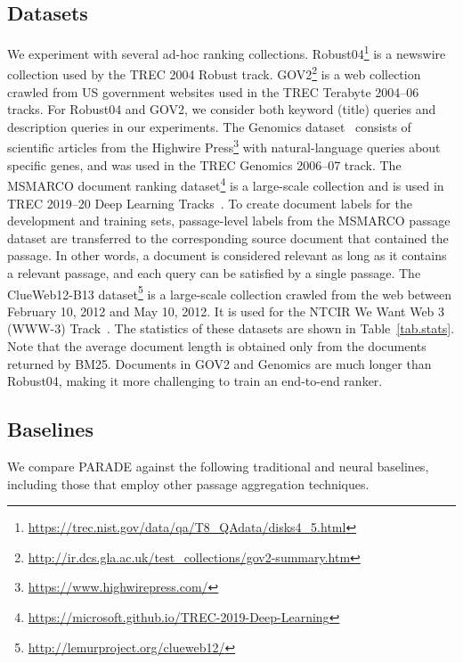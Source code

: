 










\subsection{Datasets} \label{sec:PARADE_dataset}

We experiment with several ad-hoc ranking collections.
Robust04\footnote{\url{https://trec.nist.gov/data/qa/T8_QAdata/disks4_5.html}} is a newswire collection used by the TREC 2004 Robust track.
GOV2\footnote{\url{http://ir.dcs.gla.ac.uk/test_collections/gov2-summary.htm}} is a web collection crawled from US government websites used in the TREC Terabyte 2004--06 tracks.
For Robust04 and GOV2, we consider both keyword (title) queries and description queries in our experiments.
The Genomics dataset~\cite{Hersh2006TrecGenomics,Hersh2007TrecGenomics} consists of scientific articles from the Highwire Press\footnote{\url{https://www.highwirepress.com/}} with natural-language queries about specific genes, and was used in the TREC Genomics 2006--07 track.
The MSMARCO document ranking dataset\footnote{\url{https://microsoft.github.io/TREC-2019-Deep-Learning}} is a large-scale collection and is used in TREC 2019--20 Deep Learning Tracks~\cite{DBLP:conf/trec/CraswellMYCV19,DBLP:conf/trec/CraswellMYC20}.
To create document labels for the development and training sets, passage-level labels from the MSMARCO passage dataset are transferred to the corresponding source document that contained the passage.
In other words, a document is considered relevant as long as it contains a relevant passage, and each query can be satisfied by a single passage.
The ClueWeb12-B13 dataset\footnote{\url{http://lemurproject.org/clueweb12/}} is a large-scale collection crawled from the web between February 10, 2012 and May 10, 2012. 
It is used for the NTCIR We Want Web 3 (WWW-3) Track~\cite{WWW-3}.
The statistics of these datasets are shown in Table~\ref{tab.stats}.
Note that the average document length is obtained only from the documents returned by BM25. 
Documents in GOV2 and Genomics are much longer than Robust04, making it more challenging to train an end-to-end ranker.







\subsection{Baselines}
We compare PARADE against the following traditional and neural baselines, including those that employ other passage aggregation techniques.


